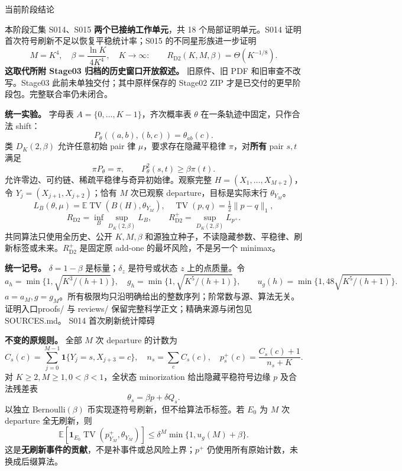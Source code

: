 \documentclass[11pt,a4paper]{article}
\newcommand{\TV}{\operatorname{TV}}\newcommand{\E}{\mathbb E}\newcommand{\R}{R_{\mathrm{D2}}}\newcommand{\Rp}{R_{\mathrm{D2}}^+}
\newcommand{\head}[2]{{\small\sffamily #1}\par\vspace{2pt}{\LARGE\bfseries #2}\par\vspace{5pt}}
\newcommand{\entry}[1]{\vfill\noindent\small 证明入口\quad #1\normalsize}
\begin{document}
\head{当前阶段结论}{对数弱混合窗口现已匹配}
本阶段汇集 S014、S015 \textbf{两个已接纳工作单元}，共 18 个局部证明单元。S014 证明首次符号刷新不足以恢复平稳统计率；S015 的不同星形族进一步证明
\[
 M=K^4,\quad\beta=\frac{\ln K}{4K^4},\quad K\to\infty:
 \qquad \R(K,M,\beta)=\Theta(K^{-1/8}).
\]
\textbf{这取代所附 Stage03 归档的历史窗口开放叙述。} 旧原件、旧 PDF 和旧审查不改写。Stage03 此前未单独交付；其中原样保存的 Stage02 ZIP 才是已交付的更早阶段包。完整联合率仍未闭合。

\textbf{统一实验。} 字母表 $A=\{0,\ldots,K-1\}$，齐次概率表 $\theta$ 在一条轨迹中固定，只作合法 shift：
\[
 P_\theta((a,b),(b,c))=\theta_{ab}(c).
\]
类 $D_K(2,\beta)$ 允许任意初始 pair 律 $\mu$，要求存在隐藏平稳律 $\pi$，对\textbf{所有} pair $s,t$ 满足
\[
 \pi P_\theta=\pi,\qquad P_\theta^2(s,t)\ge\beta\pi(t).
\]
允许零边、可约链、稀疏平稳律与奇异初始律。观察完整 $H=(X_1,\ldots,X_{M+2})$，令 $Y_j=(X_{j+1},X_{j+2})$；恰有 $M$ 次已观察 departure，目标是实际末行 $\theta_{Y_M}$。
\[
 L_B(\theta,\mu)=\E\TV(B(H),\theta_{Y_M}),\quad \TV(p,q)=\tfrac12\|p-q\|_1,
\]
\[
 \R=\inf_B\sup_{D_K(2,\beta)}L_B,\qquad \Rp=\sup_{D_K(2,\beta)}L_{p^+}.
\]
共同算法只使用全历史、公开 $K,M,\beta$ 和源独立种子，不读隐藏参数、平稳律、刷新标签或未来。$\Rp$ 是固定原 add-one 的最坏风险，不是另一个 minimax。

\textbf{统一记号。} $\delta=1-\beta$ 是标量；$\delta_z$ 是符号或状态 $z$ 上的点质量。令
\[
 a_h=\min\{1,\sqrt{K^3/(h+1)}\},\quad g_h=\min\{1,\sqrt{K^5/(h+1)}\},
 \qquad u_g(h)=\min\{1,48\sqrt{K^5/(h+1)}\}.
\]
$a=a_M,g=g_M$。所有极限均只沿明确给出的整数序列；阶常数与源、算法无关。
\entry{proofs/ 与 reviews/ 保留完整科学正文；精确来源与闭包见 SOURCES.md。}
\newpage
\head{S014 首次刷新统计障碍}{平稳符号边缘不等于平稳 pair}
\textbf{不变的原规则。} 全部 $M$ 次 departure 的计数为
\[
 C_s(c)=\sum_{j=0}^{M-1}\mathbf1\{Y_j=s,X_{j+3}=c\},\quad
 n_s=\sum_c C_s(c),\quad p_s^+(c)=\frac{C_s(c)+1}{n_s+K}.
\]
对 $K\ge2,M\ge1,0<\beta<1$，全状态 minorization 给出隐藏平稳符号边缘 $p$ 及合法残差表
\[
 \theta_s=\beta p+\delta Q_s.
\]
以独立 Bernoulli$(\beta)$ 币实现逐符号刷新，但不给算法币标签。若 $E_0$ 为 $M$ 次 departure 全无刷新，则
\[
 \E[\mathbf1_{E_0}\TV(p^+_{Y_M},\theta_{Y_M})]
 \le\delta^M\min\{1,u_g(M)+\beta\}.
\]
这是\textbf{无刷新事件的贡献}，不是补事件或总风险上界；$p^+$ 仍使用所有原始计数，未换成后缀算法。
\end{document}
